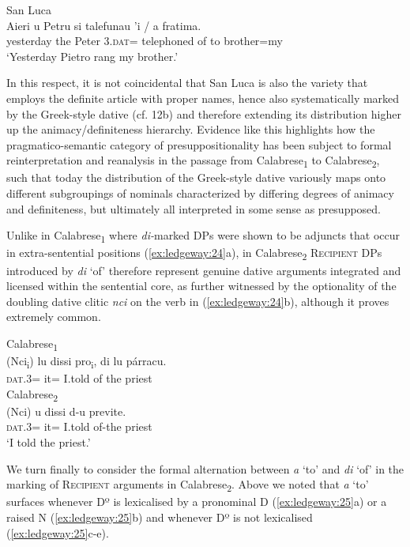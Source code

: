 \documentclass[output=paper,modfonts,nonflat,colorlinks,citecolor=brown]{langsci/langscibook}
\begin{document}
\ea\label{ex:ledgeway:23}
  San Luca\\
\gll Aieri  u  Petru  si  talefunau  ’i  /  a  fratima.\\
  yesterday  the  Peter  3.\textsc{dat}=  telephoned  of    to brother=my\\
    \glt `Yesterday Pietro rang my brother.'
    \z 

In this respect, it is not coincidental that San Luca is also the variety that employs the definite article with proper names, hence also systematically marked by the Greek-style dative (cf. 12b) and therefore extending its distribution higher up the animacy/definiteness hierarchy. Evidence like this highlights how the pragmatico-semantic category of presuppositionality has been subject to formal reinterpretation and reanalysis in the passage from Calabrese\textsubscript{1} to Calabrese\textsubscript{2}, such that today the distribution of the Greek-style dative variously maps onto different subgroupings of nominals characterized by differing degrees of animacy and definiteness, but ultimately all interpreted in some sense as presupposed.

Unlike in Calabrese\textsubscript{1} where \textit{di-}marked DPs were shown to be adjuncts that occur in extra-sentential positions (\ref{ex:ledgeway:24}a), in Calabrese\textsubscript{2} \textsc{Recipient} DPs introduced by \textit{di} ‘of’ therefore represent genuine dative arguments integrated and licensed within the sentential core, as further witnessed by the optionality of the doubling dative clitic \textit{nci} on the verb in (\ref{ex:ledgeway:24}b), although it proves extremely common.

\ea\label{ex:ledgeway:24}
\ea  Calabrese\textsubscript{1}\\
	\gll (Nci\textsubscript{i})  lu  dissi  pro\textsubscript{i},  di  lu  párracu.\\
       \textsc{dat}.3=  it=  I.told    of  the  priest\\

\ex Calabrese\textsubscript{2}\\
    \gll (Nci)  u  dissi  d-u  previte.\\
    \textsc{dat}.3=  it=  I.told  of-the  priest\\
    \glt `I told the priest.'
    \z
    \z

We turn finally to consider the formal alternation between \textit{a} ‘to’ and \textit{di} ‘of’ in the marking of \textsc{Recipient} arguments in Calabrese\textsubscript{2}. Above we noted that \textit{a} ‘to’ surfaces whenever Dº is lexicalised by a pronominal D (\ref{ex:ledgeway:25}a) or a raised N (\ref{ex:ledgeway:25}b) and whenever Dº is not lexicalised (\ref{ex:ledgeway:25}c-e).
\end{document}
